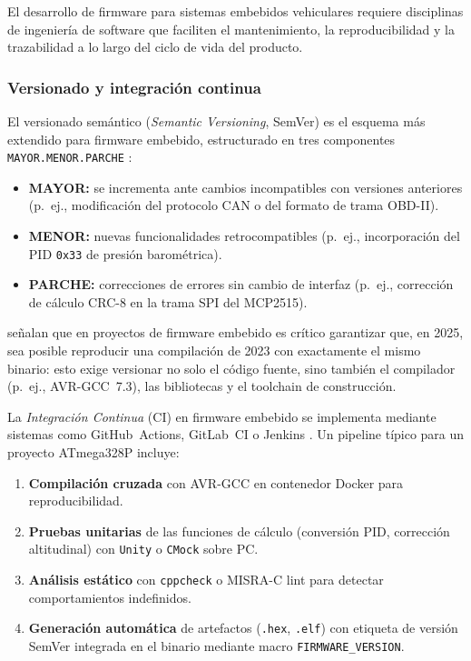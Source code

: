 El desarrollo de firmware para sistemas embebidos vehiculares
requiere disciplinas de ingeniería de software que faciliten
el mantenimiento, la reproducibilidad y la trazabilidad a lo
largo del ciclo de vida del producto.

\subsubsection{Versionado y integración continua}

El versionado semántico (\textit{Semantic Versioning},
SemVer) es el esquema más extendido para firmware embebido,
estructurado en tres componentes
\texttt{MAYOR.MENOR.PARCHE} \citep{SemVer2013}:

\begin{itemize}
	\item \textbf{MAYOR:} se incrementa ante cambios
	incompatibles con versiones anteriores (p.~ej.,
	modificación del protocolo CAN o del formato de trama
	OBD-II).
	\item \textbf{MENOR:} nuevas funcionalidades
	retrocompatibles (p.~ej., incorporación del PID
	\texttt{0x33} de presión barométrica).
	\item \textbf{PARCHE:} correcciones de errores sin cambio
	de interfaz (p.~ej., corrección de cálculo CRC-8 en
	la trama SPI del MCP2515).
\end{itemize}

\citet{SwedishEmbedded2024} señalan que en proyectos de
firmware embebido es crítico garantizar que, en 2025, sea
posible reproducir una compilación de 2023 con exactamente
el mismo binario: esto exige versionar no solo el código
fuente, sino también el compilador (p.~ej., AVR-GCC~7.3),
las bibliotecas y el toolchain de construcción.

La \textit{Integración Continua} (CI) en firmware embebido
se implementa mediante sistemas como GitHub~Actions,
GitLab~CI o Jenkins \citep{DojoCICD2025}.  Un pipeline
típico para un proyecto ATmega328P incluye:

\begin{enumerate}
	\item \textbf{Compilación cruzada} con AVR-GCC en
	contenedor Docker para reproducibilidad.
	\item \textbf{Pruebas unitarias} de las funciones de
	cálculo (conversión PID, corrección altitudinal) con
	\texttt{Unity} o \texttt{CMock} sobre PC.
	\item \textbf{Análisis estático} con \texttt{cppcheck} o
	MISRA-C lint para detectar comportamientos
	indefinidos.
	\item \textbf{Generación automática} de artefactos
	(\texttt{.hex}, \texttt{.elf}) con etiqueta de
	versión SemVer integrada en el binario mediante
	macro \texttt{FIRMWARE\_VERSION}.
\end{enumerate}

